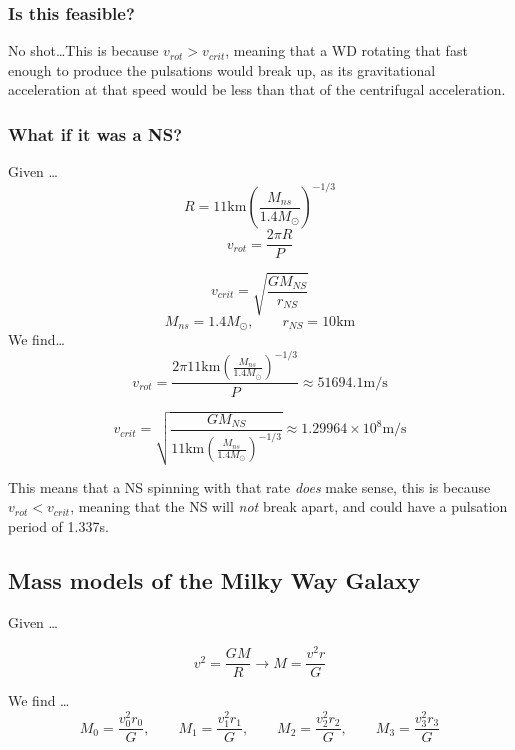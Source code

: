 \documentclass{article}
\begin{document}
\subsubsection{Is this feasible?}
No shot\dots This is because \(\boxed{v_{rot} > v_{crit}}\), meaning that a WD rotating that fast enough to produce the pulsations would break up, as its gravitational acceleration at that speed would be less than that of the centrifugal acceleration. 

\subsubsection{What if it was a NS?}
Given \dots
\[R = 11\text{km} \left(\frac{M_{ns}}{1.4M_\odot}\right)^{-1/3}\]
\[v_{rot}= \frac{2\pi R}{P}\]


\[v_{crit} = \sqrt{\frac{GM_{NS}}{r_{NS}}}\]
\[M_{ns} = 1.4 M_\odot, \qquad r_{NS} = 10\text{km}\]
We find\dots
\[v_{rot}= \frac{2\pi 11\text{km} \left(\frac{M_{ns}}{1.4M_\odot}\right)^{-1/3}}{P} \boxed{\approx 51694.1 \text{m/s}}\]

\[v_{crit} = \sqrt{\frac{GM_{NS}}{11\text{km} \left(\frac{M_{ns}}{1.4M_\odot}\right)^{-1/3}}} \boxed{ \approx 1.29964 \times 10^8 \text{m/s} }\]





This means that a NS spinning with that rate \textit{does} make sense, this is because \(\boxed{ v_{rot} < v_{crit}}\), meaning that the NS will \textit{not} break apart, and could have a pulsation period of 1.337s.

\subsection{Mass models of the Milky Way Galaxy}
Given \dots

\[v^2 = \frac{GM}{R} \rightarrow M= \frac{v^2 r}{G}\]

We find \dots
\[M_0 = \frac{v_0^2 r_0}{G}, \qquad M_1 = \frac{v_1^2 r_1}{G}, \qquad M_2 = \frac{v_2^2 r_2}{G}, \qquad M_3 = \frac{v_3^2 r_3}{G}\]
\end{document}
